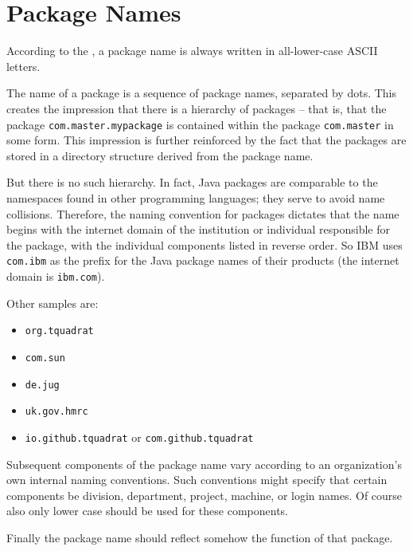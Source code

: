 \section{Package Names}\label{sec:Packages}
According to the  \autocite{SUN_CODE_CONVENTIONS:NamingConventions}, a package name is always written in all-lower-case ASCII letters.

The name of a package is a sequence of package names, separated by dots. This creates the impression that there is a hierarchy of packages – that is, that the package \lstinline|com.master.mypackage| is contained within the package \lstinline|com.master| in some form. This impression is further reinforced by the fact that the packages are stored in a directory structure derived from the package name.

But there is no such hierarchy. In fact, Java packages are comparable to the namespaces found in other programming languages; they serve to avoid name collisions. Therefore, the naming convention for packages dictates that the name begins with the internet domain of the institution or individual responsible for the package, with the individual components listed in reverse order. So IBM uses \lstinline|com.ibm| as the prefix for the Java package names of their products (the internet domain is \verb#ibm.com#).

Other samples are:
\begin{itemize}[nosep]
\item{\lstinline|org.tquadrat|}
\item{\lstinline|com.sun|}
\item{\lstinline|de.jug|}
\item{\lstinline|uk.gov.hmrc|}
\item{\lstinline|io.github.tquadrat| or \lstinline|com.github.tquadrat|}
\end{itemize}

Subsequent components of the package name vary according to an organization's own internal naming conventions. Such conventions might specify that certain components be division, department, project, machine, or login names. Of course also only lower case should be used for these components.

Finally the package name should reflect somehow the function of that package.

